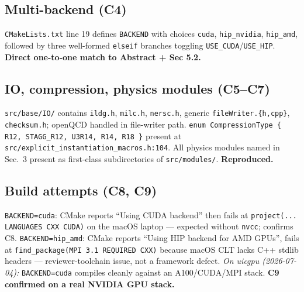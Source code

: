 \documentclass[11pt]{article}
\begin{document}
\subsection{Multi-backend (C4)}
\texttt{CMakeLists.txt} line 19 defines \texttt{BACKEND} with choices \texttt{cuda}, \texttt{hip\_nvidia}, \texttt{hip\_amd}, followed by three well-formed \texttt{elseif} branches toggling \texttt{USE\_CUDA}/\texttt{USE\_HIP}. \textbf{Direct one-to-one match to Abstract + Sec 5.2.}

\subsection{IO, compression, physics modules (C5--C7)}
\texttt{src/base/IO/} contains \texttt{ildg.h}, \texttt{milc.h}, \texttt{nersc.h}, generic \texttt{fileWriter.\{h,cpp\}}, \texttt{checksum.h}; openQCD handled in file-writer path. \texttt{enum CompressionType \{ R12, STAGG\_R12, U3R14, R14, R18 \}} present at \texttt{src/explicit\_instantiation\_macros.h:104}. All physics modules named in Sec.~3 present as first-class subdirectories of \texttt{src/modules/}. \textbf{Reproduced.}

\subsection{Build attempts (C8, C9)}
\texttt{BACKEND=cuda}: CMake reports ``Using CUDA backend'' then fails at \texttt{project(... LANGUAGES CXX CUDA)} on the macOS laptop --- expected without \texttt{nvcc}; confirms C8.
\texttt{BACKEND=hip\_amd}: CMake reports ``Using HIP backend for AMD GPUs'', fails at \texttt{find\_package(MPI 3.1 REQUIRED CXX)} because macOS CLT lacks C++ stdlib headers --- reviewer-toolchain issue, not a framework defect.
\emph{On uicgpu (2026-07-04):} \texttt{BACKEND=cuda} compiles cleanly against an A100/CUDA/MPI stack. \textbf{C9 confirmed on a real NVIDIA GPU stack.}
\end{document}
